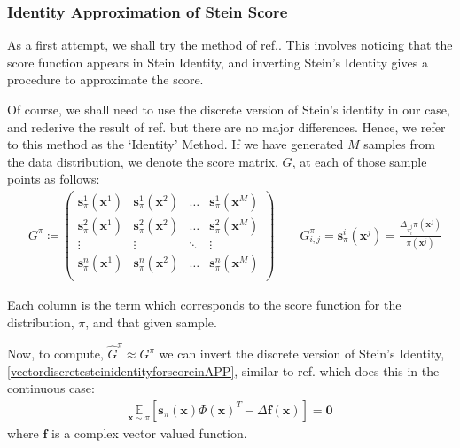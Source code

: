 \subsubsection{Identity Approximation of Stein Score} \label{app:identitysteinscore}
As a first attempt, we shall try the method of ref.. This  involves noticing that the score function appears in Stein Identity, and inverting Stein's Identity gives a procedure to approximate the score.

Of course, we shall need to use the discrete version of Stein's identity in our case, and rederive the result of ref. but there are no major differences. Hence, we refer to this method as the `Identity' Method.
If we have generated $M$ samples from the data distribution, we denote the score matrix, $G$, at each of those sample points as follows: 
\begin{align}
&G^{\pi}  \coloneqq \left(\begin{array}{cccc}
    \mathbf{s}^1_\pi(\mathbf{x}^1)  & \mathbf{s}^1_\pi(\mathbf{x}^2)  &\dots &\mathbf{s}^1_\pi(\mathbf{x}^M)   \\
     \mathbf{s}^2_\pi(\mathbf{x}^1)  & \mathbf{s}^2_\pi(\mathbf{x}^2)  &\dots &\mathbf{s}^2_\pi(\mathbf{x}^M)     \\
         \vdots & \vdots &\ddots &\vdots   \\
    \mathbf{s}^n_\pi(\mathbf{x}^1)  & \mathbf{s}^n_\pi(\mathbf{x}^2)  &\dots &\mathbf{s}^n_\pi(\mathbf{x}^M)    \\
\end{array}\right)\label{steinscorematrix}
\qquad G^{\pi}_{i,j} = \mathbf{s}^i_\pi(\mathbf{x}^j) = \frac{\Delta_{x_i^j}\pi(\mathbf{x}^j)}{\pi(\mathbf{x}^j)}
\end{align}

Each column is the term which corresponds to the score function for the distribution, $\pi$, and that given sample.

Now, to compute, $\hat{G}^{\pi} \approx G^{\pi}$ we can invert the discrete version of Stein's Identity, \eqref{vectordiscretesteinidentityforscoreinAPP}, similar to ref. which does this in the continuous case:
\begin{align}
    \underset{\mathbf{x}\sim \pi}{\mathbb{E}}[\mathbf{s}_{\pi}(\mathbf{x})\Phi(\mathbf{x})^T - \Delta \mathbf{f}(\mathbf{x})] = \mathbf{0} \label{vectordiscretesteinidentityforscoreinAPP}
\end{align}
where $\mathbf{f}$ is a complex vector valued function.

